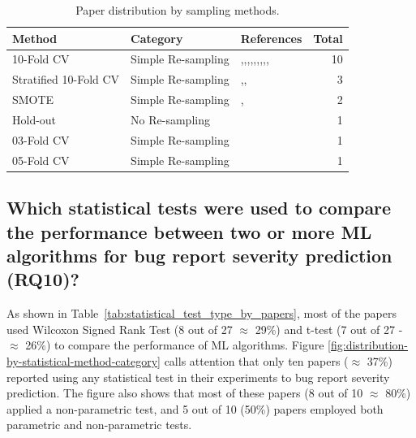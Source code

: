\begin{table}[h!]
  \centering
  \captionsetup{type=table}
  \caption{Paper distribution by sampling methods.}
  \small
  \begin{tabular}{@{}llp{8cm}r@{}}
    \toprule
    \textbf{Method} & \textbf{Category} & \textbf{References} & \textbf{Total} \\
    \midrule
    10-Fold CV & Simple Re-sampling & \cite{Lamkanfi:2011},\cite{Yang:2012},\cite{Chaturvedi:2012},\cite{Yang:2014a},\cite{Xia:2015},\cite{Pushpalathas:2016},\cite{Otoom:2016},\cite{Jin:2016b},\cite{Yang:2017},\cite{Roy:2017} & 10 \\
    \midrule
    Stratified 10-Fold CV\footnotemark & Simple Re-sampling & \cite{Valdivia:2014},\cite{Roy:2014},\cite{Singh:2017} & 3 \\
    \midrule
    SMOTE\footnotemark & Simple Re-sampling & \cite{Xia:2015},\cite{Choeikiwong:2016} & 2 \\
    \midrule
    Hold-out & No Re-sampling & \cite{Otoom:2016} & 1 \\
    \midrule
    03-Fold CV & Simple Re-sampling & \cite{Choeikiwong:2016} & 1 \\
    \midrule
    05-Fold CV & Simple Re-sampling & \cite{Sharma:2015} & 1 \\
    \bottomrule
  \end{tabular} 
  \label{tab:sampling_methods_by_papers}
\end{table}

\subsection{Which statistical tests were used to compare the performance between two or more ML algorithms for bug report severity prediction (RQ10)?}\label{subsec:rq10}

As shown in Table~\ref{tab:statistical_test_type_by_papers}, most of the papers used  Wilcoxon Signed Rank Test (8 out of 27 $\approx$ 29\%) and t-test (7 out of 27 - $\approx$ 26\%) to compare the performance of ML algorithms. Figure \ref{fig:distribution-by-statistical-method-category} calls attention that only ten papers ($\approx$ 37\%) reported using any statistical test in their experiments to bug report severity prediction. The figure also shows that most of these papers  (8 out of 10 $\approx$ 80\%) applied a non-parametric test, and 5 out of 10 (50\%) papers employed both parametric and non-parametric tests.  


